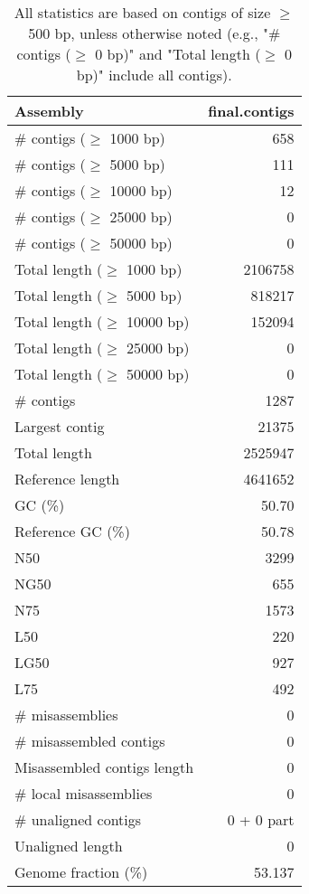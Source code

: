\documentclass[12pt,a4paper]{article}
\begin{document}
\begin{table}[ht]
\begin{center}
\caption{All statistics are based on contigs of size $\geq$ 500 bp, unless otherwise noted (e.g., "\# contigs ($\geq$ 0 bp)" and "Total length ($\geq$ 0 bp)" include all contigs).}
\begin{tabular}{|l*{1}{|r}|}
\hline
Assembly & final.contigs \\ \hline
\# contigs ($\geq$ 1000 bp) & 658 \\ \hline
\# contigs ($\geq$ 5000 bp) & 111 \\ \hline
\# contigs ($\geq$ 10000 bp) & 12 \\ \hline
\# contigs ($\geq$ 25000 bp) & 0 \\ \hline
\# contigs ($\geq$ 50000 bp) & 0 \\ \hline
Total length ($\geq$ 1000 bp) & 2106758 \\ \hline
Total length ($\geq$ 5000 bp) & 818217 \\ \hline
Total length ($\geq$ 10000 bp) & 152094 \\ \hline
Total length ($\geq$ 25000 bp) & 0 \\ \hline
Total length ($\geq$ 50000 bp) & 0 \\ \hline
\# contigs & 1287 \\ \hline
Largest contig & 21375 \\ \hline
Total length & 2525947 \\ \hline
Reference length & 4641652 \\ \hline
GC (\%) & 50.70 \\ \hline
Reference GC (\%) & 50.78 \\ \hline
N50 & 3299 \\ \hline
NG50 & 655 \\ \hline
N75 & 1573 \\ \hline
L50 & 220 \\ \hline
LG50 & 927 \\ \hline
L75 & 492 \\ \hline
\# misassemblies & 0 \\ \hline
\# misassembled contigs & 0 \\ \hline
Misassembled contigs length & 0 \\ \hline
\# local misassemblies & 0 \\ \hline
\# unaligned contigs & 0 + 0 part \\ \hline
Unaligned length & 0 \\ \hline
Genome fraction (\%) & 53.137 \\ \hline

\end{tabular}
\end{center}
\end{table}
\end{document}
